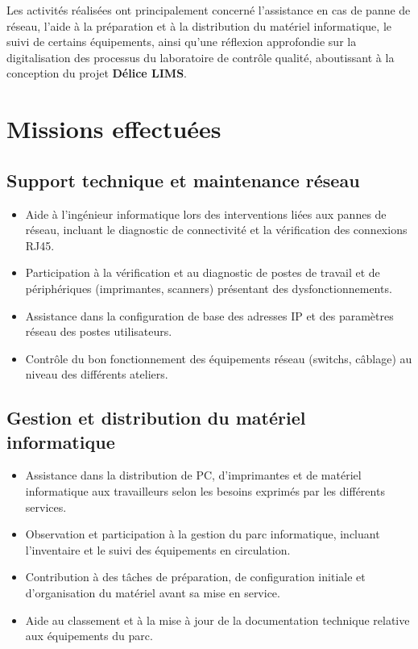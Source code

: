 \documentclass[12pt,a4paper,oneside]{report}
\begin{document}
Les activités réalisées ont principalement concerné l'assistance en cas de panne de réseau, l'aide à la préparation et à la distribution du matériel informatique, le suivi de certains équipements, ainsi qu'une réflexion approfondie sur la digitalisation des processus du laboratoire de contrôle qualité, aboutissant à la conception du projet \textbf{Délice LIMS}.

\section{Missions effectuées}

\subsection{Support technique et maintenance réseau}
\begin{itemize}[leftmargin=1.2cm]
\item Aide à l'ingénieur informatique lors des interventions liées aux pannes de réseau, incluant le diagnostic de connectivité et la vérification des connexions RJ45.
\item Participation à la vérification et au diagnostic de postes de travail et de périphériques (imprimantes, scanners) présentant des dysfonctionnements.
\item Assistance dans la configuration de base des adresses IP et des paramètres réseau des postes utilisateurs.
\item Contrôle du bon fonctionnement des équipements réseau (switchs, câblage) au niveau des différents ateliers.
\end{itemize}

\subsection{Gestion et distribution du matériel informatique}
\begin{itemize}[leftmargin=1.2cm]
\item Assistance dans la distribution de PC, d'imprimantes et de matériel informatique aux travailleurs selon les besoins exprimés par les différents services.
\item Observation et participation à la gestion du parc informatique, incluant l'inventaire et le suivi des équipements en circulation.
\item Contribution à des tâches de préparation, de configuration initiale et d'organisation du matériel avant sa mise en service.
\item Aide au classement et à la mise à jour de la documentation technique relative aux équipements du parc.
\end{itemize}
\end{document}
